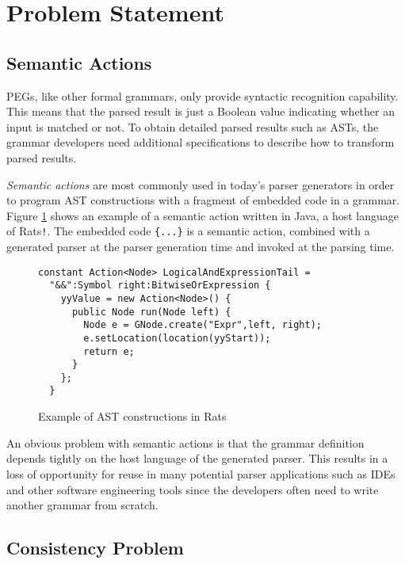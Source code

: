 \documentclass[JIP]{ipsj}
\begin{document}
\section{Problem Statement} 



\subsection{Semantic Actions}

PEGs, like other formal grammars, only provide syntactic recognition capability. This means that  the parsed result is just a Boolean value indicating whether an input is matched or not. To obtain detailed parsed results such as ASTs, the grammar developers need additional specifications to describe how to transform parsed results. 

{\em Semantic actions} are most commonly used in today's parser generators in order to program AST constructions with a fragment of embedded code in a grammar. Figure \ref{fig:action} shows an example of a semantic action written in Java, a host language of Rats\verb|!|\cite{PLDI06_Rats}. The embedded code \verb|{...}| is a semantic action,  combined with a generated parser at the parser generation time and invoked at the parsing time. 

\begin{figure}[htb]
\begin{framed}
{\small \begin{verbatim}
constant Action<Node> LogicalAndExpressionTail =
  "&&":Symbol right:BitwiseOrExpression {
    yyValue = new Action<Node>() {
      public Node run(Node left) {
        Node e = GNode.create("Expr",left, right);
        e.setLocation(location(yyStart));
        return e;
      }
    };
  }
\end{verbatim} }
\end{framed}
\caption{Example of AST constructions in Rats }
\label{fig:action}
\end{figure}

An obvious problem with semantic actions is that the grammar definition depends tightly on the host language of the generated parser. This results in a loss of opportunity for reuse in many potential parser applications such as IDEs and other software engineering tools since the developers often need to write another grammar from scratch.

\subsection{Consistency Problem}
\end{document}
